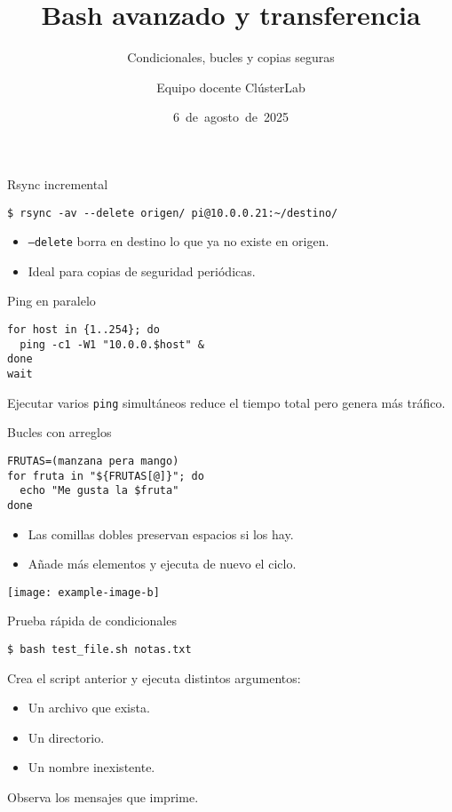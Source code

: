 \documentclass[aspectratio=169,professionalfonts]{beamer}
\title[ClústerLab • Día 2]{Bash avanzado y transferencia}
\subtitle{Condicionales, bucles y copias seguras}
\author{Equipo docente ClústerLab}
\date{6 de agosto de 2025}
\begin{document}
\begin{frame}[plain]
  \titlepage
\end{frame}

\begin{frame}[fragile]{Rsync incremental}
  \begin{verbatim}
$ rsync -av --delete origen/ pi@10.0.0.21:~/destino/
  \end{verbatim}
  \begin{itemize}
    \item \texttt{--delete} borra en destino lo que ya no existe en origen.
    \item Ideal para copias de seguridad periódicas.
  \end{itemize}
\end{frame}

\begin{frame}[fragile]{Ping en paralelo}
  \begin{verbatim}
for host in {1..254}; do
  ping -c1 -W1 "10.0.0.$host" &
done
wait
  \end{verbatim}
  Ejecutar varios \texttt{ping} simultáneos reduce el tiempo total pero genera más tráfico.
\end{frame}

\begin{frame}[fragile]{Bucles con arreglos}
  \begin{verbatim}
FRUTAS=(manzana pera mango)
for fruta in "${FRUTAS[@]}"; do
  echo "Me gusta la $fruta"
done
  \end{verbatim}
  \begin{itemize}
    \item Las comillas dobles preservan espacios si los hay.
    \item Añade más elementos y ejecuta de nuevo el ciclo.
  \end{itemize}
  \begin{center}
    \texttt{[image: example-image-b]}
  \end{center}
\end{frame}

\begin{frame}[fragile]{Prueba rápida de condicionales}
  \begin{verbatim}
$ bash test_file.sh notas.txt
  \end{verbatim}
  Crea el script anterior y ejecuta distintos argumentos:
  \begin{itemize}
    \item Un archivo que exista.
    \item Un directorio.
    \item Un nombre inexistente.
  \end{itemize}
  Observa los mensajes que imprime.
\end{frame}
\end{document}
